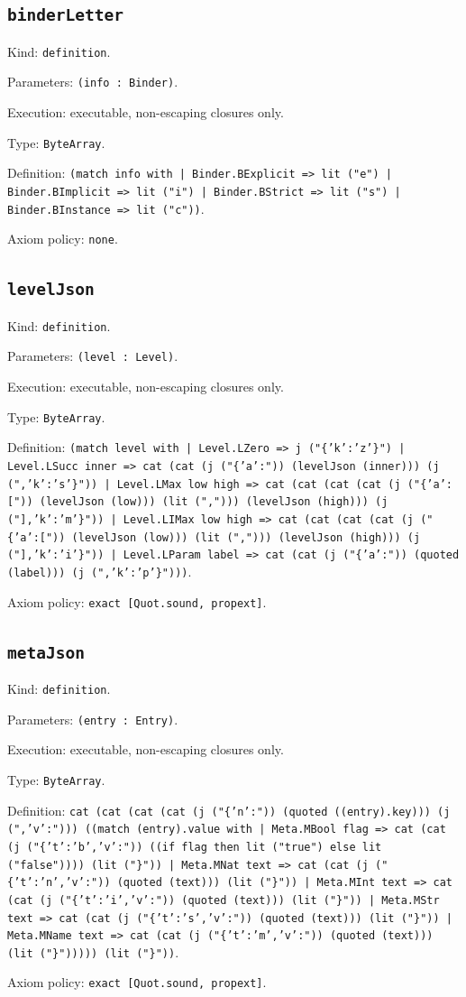 \documentclass[11pt]{article}
\begin{document}
\subsection*{\texttt{binderLetter}}
\noindent Kind: \texttt{definition}.\par
\noindent Parameters: \texttt{(info : Binder)}.\par
\noindent Execution: executable, non-escaping closures only.\par
\noindent Type: \texttt{ByteArray}.\par
\noindent Definition: \texttt{(match info with | Binder.BExplicit => lit ("e") | Binder.BImplicit => lit ("i") | Binder.BStrict => lit ("s") | Binder.BInstance => lit ("c"))}.\par
\noindent Axiom policy: \texttt{none}.\par
\subsection*{\texttt{levelJson}}
\noindent Kind: \texttt{definition}.\par
\noindent Parameters: \texttt{(level : Level)}.\par
\noindent Execution: executable, non-escaping closures only.\par
\noindent Type: \texttt{ByteArray}.\par
\noindent Definition: \texttt{(match level with | Level.LZero => j ("\{'k':'z'\}") | Level.LSucc inner => cat (cat (j ("\{'a':")) (levelJson (inner))) (j (",'k':'s'\}")) | Level.LMax low high => cat (cat (cat (cat (j ("\{'a':[")) (levelJson (low))) (lit (","))) (levelJson (high))) (j ("],'k':'m'\}")) | Level.LIMax low high => cat (cat (cat (cat (j ("\{'a':[")) (levelJson (low))) (lit (","))) (levelJson (high))) (j ("],'k':'i'\}")) | Level.LParam label => cat (cat (j ("\{'a':")) (quoted (label))) (j (",'k':'p'\}")))}.\par
\noindent Axiom policy: \texttt{exact [Quot.sound, propext]}.\par
\subsection*{\texttt{metaJson}}
\noindent Kind: \texttt{definition}.\par
\noindent Parameters: \texttt{(entry : Entry)}.\par
\noindent Execution: executable, non-escaping closures only.\par
\noindent Type: \texttt{ByteArray}.\par
\noindent Definition: \texttt{cat (cat (cat (cat (j ("\{'n':")) (quoted ((entry).key))) (j (",'v':"))) ((match (entry).value with | Meta.MBool flag => cat (cat (j ("\{'t':'b','v':")) ((if flag then lit ("true") else lit ("false")))) (lit ("\}")) | Meta.MNat text => cat (cat (j ("\{'t':'n','v':")) (quoted (text))) (lit ("\}")) | Meta.MInt text => cat (cat (j ("\{'t':'i','v':")) (quoted (text))) (lit ("\}")) | Meta.MStr text => cat (cat (j ("\{'t':'s','v':")) (quoted (text))) (lit ("\}")) | Meta.MName text => cat (cat (j ("\{'t':'m','v':")) (quoted (text))) (lit ("\}"))))) (lit ("\}"))}.\par
\noindent Axiom policy: \texttt{exact [Quot.sound, propext]}.\par
\end{document}
